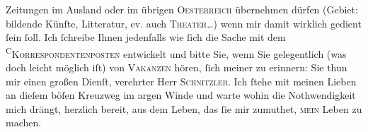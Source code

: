               Zeitungen im Ausland oder im übrigen \textsc{Oesterreich} übernehmen dürfen (Gebiet: bildende Künſte, Litteratur, ev. auch
                  \textsc{Theater}{\dots}) wenn mir damit wirklich gedient{ }ſein{ }ſoll.
               Ich{ }ſchreibe Ihnen jedenfalls wie{ }ſich die Sache mit dem \substVorne{}\textsuperscript{\textsc{C}}\substDazwischen{}\textsc{K}\substHinten{}\textsc{orrespondentenposten} entwickelt und bitte Sie, wenn
               Sie gelegentlich (was doch leicht möglich iſt) von \textsc{Vakanzen}
               hören,{ }ſich meiner zu erinnern: Sie thun mir einen großen Dienſt, verehrter Herr \textsc{Schnitzler}. Ich{ }ſtehe mit meinen Lieben an dieſem böſen
               Kreuzweg im argen Winde und warte wohin die Nothwendigkeit {\pb}mich drängt, herzlich bereit, aus dem Leben, das{ }ſie mir
               zumuthet, \textsc{mein} Leben zu machen.\pend
           
